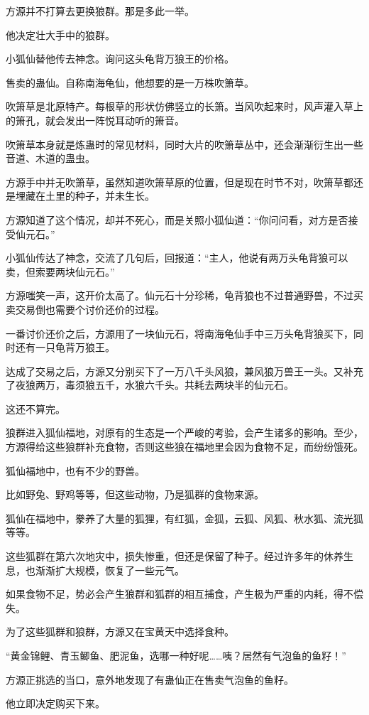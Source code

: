 \begin{this_body}
方源并不打算去更换狼群。那是多此一举。

他决定壮大手中的狼群。

小狐仙替他传去神念。询问这头龟背万狼王的价格。

售卖的蛊仙。自称南海龟仙，他想要的是一万株吹箫草。

吹箫草是北原特产。每根草的形状仿佛竖立的长箫。当风吹起来时，风声灌入草上的箫孔，就会发出一阵悦耳动听的箫音。

吹箫草本身就是炼蛊时的常见材料，同时大片的吹箫草丛中，还会渐渐衍生出一些音道、木道的蛊虫。

方源手中并无吹箫草，虽然知道吹箫草原的位置，但是现在时节不对，吹箫草都还是埋藏在土里的种子，并未生长。

方源知道了这个情况，却并不死心，而是关照小狐仙道：“你问问看，对方是否接受仙元石。”

小狐仙传达了神念，交流了几句后，回报道：“主人，他说有两万头龟背狼可以卖，但索要两块仙元石。”

方源嗤笑一声，这开价太高了。仙元石十分珍稀，龟背狼也不过普通野兽，不过买卖交易倒也需要个讨价还价的过程。

一番讨价还价之后，方源用了一块仙元石，将南海龟仙手中三万头龟背狼买下，同时还有一只龟背万狼王。

达成了交易之后，方源又分别买下了一万八千头风狼，兼风狼万兽王一头。又补充了夜狼两万，毒须狼五千，水狼六千头。共耗去两块半的仙元石。

这还不算完。

狼群进入狐仙福地，对原有的生态是一个严峻的考验，会产生诸多的影响。至少，方源得给这些狼群补充食物，否则这些狼在福地里会因为食物不足，而纷纷饿死。

狐仙福地中，也有不少的野兽。

比如野兔、野鸡等等，但这些动物，乃是狐群的食物来源。

狐仙在福地中，豢养了大量的狐狸，有红狐，金狐，云狐、风狐、秋水狐、流光狐等等。

这些狐群在第六次地灾中，损失惨重，但还是保留了种子。经过许多年的休养生息，也渐渐扩大规模，恢复了一些元气。

如果食物不足，势必会产生狼群和狐群的相互捕食，产生极为严重的内耗，得不偿失。

为了这些狐群和狼群，方源又在宝黄天中选择食种。

“黄金锦鲤、青玉鲫鱼、肥泥鱼，选哪一种好呢……咦？居然有气泡鱼的鱼籽！”

方源正挑选的当口，意外地发现了有蛊仙正在售卖气泡鱼的鱼籽。

他立即决定购买下来。


\end{this_body}
